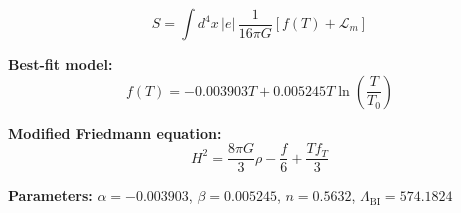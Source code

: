 
\begin{equation}
  S = \int d^4x \, |e| \, \frac{1}{16\pi G} \left[ f(T) + \mathcal{L}_m \right]
\end{equation}

\textbf{Best-fit model:}
\begin{equation}
  f(T) = -0.003903 T + 0.005245 T \ln\!\left(\frac{T}{T_0}\right)
\end{equation}

\textbf{Modified Friedmann equation:}
\begin{equation}
  H^2 = \frac{8\pi G}{3} \rho - \frac{f}{6} + \frac{T f_T}{3}
\end{equation}

\textbf{Parameters:}
$\alpha = -0.003903$, \quad
$\beta = 0.005245$, \quad
$n = 0.5632$, \quad
$\Lambda_{\text{BI}} = 574.1824$